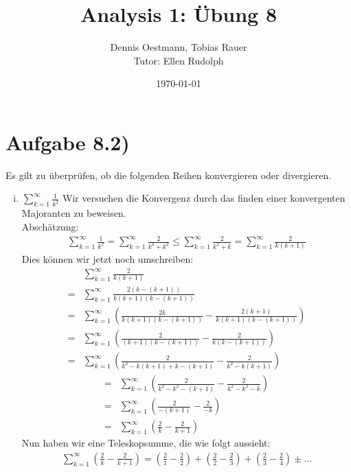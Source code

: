 \documentclass{scrartcl}
\title{Analysis 1: Übung 8}
\author{Dennis Oestmann, Tobias Rauer\\Tutor: Ellen Rudolph}
\date{\today}
\begin{document}
\maketitle

\newpage

\section*{Aufgabe 8.2)}
	Es gilt zu überprüfen, ob die folgenden Reihen konvergieren oder divergieren.
	\begin{enumerate}[(i)]
	  
		\item $\sum^{\infty}_{k=1}\frac{1}{k^2}$ Wir versuchen die Konvergenz durch das finden einer konvergenten Majoranten zu beweisen. \\
			Abschätzung:
			\begin{align*}
				\sum^{\infty}_{k=1}\frac{1}{k^2} = \sum^{\infty}_{k=1}\frac{2}{k^2 + k^2} \leq \sum^{\infty}_{k=1}\frac{2}{k^2 + k} = \sum^{\infty}_{k=1}\frac{2}{k(k + 1)}
			\end{align*}
			Dies können wir jetzt noch umschreiben:
			\begin{align*}
				&\sum^{\infty}_{k=1}\frac{2}{k(k + 1)} \\
				= & \sum^{\infty}_{k=1}\frac{2(k-(k+1))}{k(k + 1)(k-(k+1))} \\
				= & \sum^{\infty}_{k=1}\left(\frac{2k}{k(k+1)(k-(k+1))}-\frac{2(k+1)}{k(k+1)(k-(k+1))}\right) \\
				= & \sum^{\infty}_{k=1}\left(\frac{2}{(k+1)(k-(k+1))}-\frac{2}{k(k-(k+1))}\right) \\
				= & \sum^{\infty}_{k=1}\left(\frac{2}{k^2-k(k+1)+k-(k+1)}-\frac{2}{k^2-k(k+1)}\right)
			\end{align*}
			\begin{align*}
				= & \sum^{\infty}_{k=1}\left(\frac{2}{k^2-k^2-(k+1)}-\frac{2}{k^2-k^2-k}\right) \\
				= & \sum^{\infty}_{k=1}\left(\frac{2}{-(k+1)}-\frac{2}{-k}\right) \\
				= & \sum^{\infty}_{k=1}\left(\frac{2}{k}-\frac{2}{k+1}\right)
			\end{align*}
			Nun haben wir eine Teleskopsumme, die wie folgt aussieht:
			\begin{align*}
				\sum^{\infty}_{k=1}\left(\frac{2}{k}-\frac{2}{k+1}\right) = \left(\frac{2}{1} - \frac{2}{2}\right) + \left(\frac{2}{2} - \frac{2}{3}\right) + \left(\frac{2}{3} - \frac{2}{4}\right) \pm \ldots
			\end{align*}

\end{enumerate}
\end{document}
